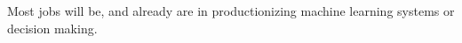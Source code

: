 \begin{frame}{}
    \begin{statement}
      Most \alert{jobs} will be, and already are in \alert{productionizing} machine learning systems or \alert{decision making}.
      \end{statement}
\end{frame}


\chapterreferences
